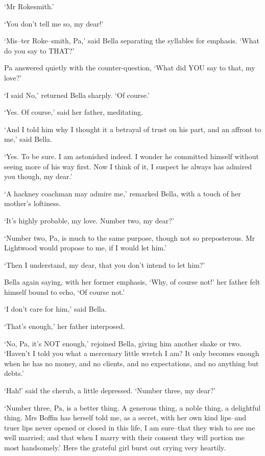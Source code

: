 ‘Mr Rokesmith.’

‘You don’t tell me so, my dear!’

‘Mis--ter Roke--smith, Pa,’ said Bella separating the syllables for
emphasis. ‘What do you say to THAT?’

Pa answered quietly with the counter-question, ‘What did YOU say to
that, my love?’

‘I said No,’ returned Bella sharply. ‘Of course.’

‘Yes. Of course,’ said her father, meditating.

‘And I told him why I thought it a betrayal of trust on his part, and an
affront to me,’ said Bella.

‘Yes. To be sure. I am astonished indeed. I wonder he committed himself
without seeing more of his way first. Now I think of it, I suspect he
always has admired you though, my dear.’

‘A hackney coachman may admire me,’ remarked Bella, with a touch of her
mother’s loftiness.

‘It’s highly probable, my love. Number two, my dear?’

‘Number two, Pa, is much to the same purpose, though not so
preposterous. Mr Lightwood would propose to me, if I would let him.’

‘Then I understand, my dear, that you don’t intend to let him?’

Bella again saying, with her former emphasis, ‘Why, of course not!’ her
father felt himself bound to echo, ‘Of course not.’

‘I don’t care for him,’ said Bella.

‘That’s enough,’ her father interposed.

‘No, Pa, it’s NOT enough,’ rejoined Bella, giving him another shake or
two. ‘Haven’t I told you what a mercenary little wretch I am? It
only becomes enough when he has no money, and no clients, and no
expectations, and no anything but debts.’

‘Hah!’ said the cherub, a little depressed. ‘Number three, my dear?’

‘Number three, Pa, is a better thing. A generous thing, a noble thing, a
delightful thing. Mrs Boffin has herself told me, as a secret, with her
own kind lips--and truer lips never opened or closed in this life, I am
sure--that they wish to see me well married; and that when I marry with
their consent they will portion me most handsomely.’ Here the grateful
girl burst out crying very heartily.

